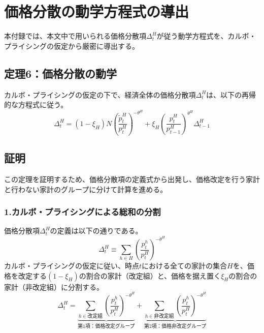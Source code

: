 
\chapter{価格分散の動学方程式の導出}
\label{chap:appendix_dispersion_dynamics}

本付録では、本文中で用いられる価格分散項\(\Delta_t^H\)が従う動学方程式を、カルボ・プライシングの仮定から厳密に導出する。

\section*{定理6：価格分散の動学}
\label{sec:appendix_dispersion_dynamics_theorem6}
カルボ・プライシングの仮定の下で、経済全体の価格分散項\(\Delta_t^H\)は、以下の再帰的な方程式に従う。
\begin{equation}
\Delta_t^H=(1-\xi_H)N\left(\frac{\tilde{p}_t^H}{p_t^H}\right)^{-\theta^H}+\xi_H\left(\frac{p_t^H}{p_{t-1}^H}\right)^{\theta^H}\Delta_{t-1}^H
\label{eq:appendix_dispersion_dynamics_theorem6_main}
\end{equation}

\section*{証明}
\label{sec:appendix_dispersion_dynamics_proof}

この定理を証明するため、価格分散項の定義式から出発し、価格改定を行う家計と行わない家計のグループに分けて計算を進める。

\subsection*{1.カルボ・プライシングによる総和の分割}
\label{sec:appendix_dispersion_dynamics_sub1}
価格分散項\(\Delta_t^H\)の定義は以下の通りである。
\begin{equation}
\Delta_t^H\equiv\sum_{h\in H}\left(\frac{p_t^h}{p_t^H}\right)^{-\theta^H}
\label{eq:appendix_dispersion_dynamics_sub1_definition}
\end{equation}
カルボ・プライシングの仮定に従い、時点\(t\)における全ての家計の集合\(H\)を、価格を改定する\((1-\xi_H)\)の割合の家計（改定組）と、価格を据え置く\(\xi_H\)の割合の家計（非改定組）に分割する。
\begin{equation}
\Delta_t^H=\underbrace{\sum_{h\in\text{改定組}}\left(\frac{p_t^h}{p_t^H}\right)^{-\theta^H}}_{\text{第1項：価格改定グループ}}+\underbrace{\sum_{h\in\text{非改定組}}\left(\frac{p_t^h}{p_t^H}\right)^{-\theta^H}}_{\text{第2項：価格非改定グループ}}
\label{eq:appendix_dispersion_dynamics_sub1_decomposition}
\end{equation}

